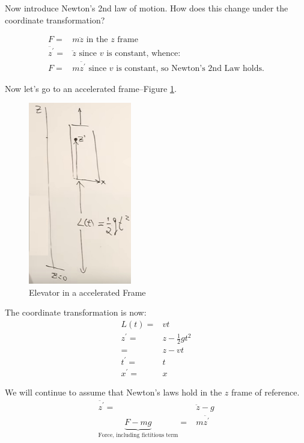 \documentclass[]{article}
\begin{document}
Now introduce Newton's 2nd law of motion. How does this change under the coordinate transformation?

\begin{align*}
	F =& m \ddot{z} \text{ in the $z$ frame}\\
	\ddot{z^\prime} =& \ddot{z} \text{ since $v$ is constant, whence:}\\
	F =& m \ddot{z^\prime} \text{ since $v$ is constant, so Newton's 2nd Law holds.}
\end{align*}

Now let's go to an accelerated frame--Figure \ref{fig:gr-1-elevator-accelerated}.

\begin{figure}[H]
	\begin{center}
		\caption{Elevator in a accelerated Frame}\label{fig:gr-1-elevator-accelerated}
		\includegraphics[width=0.4\textwidth]{gr-1-elevator-accelerated}
	\end{center}
\end{figure}

The coordinate transformation is now:
\begin{align*}
	L(t)=&vt\\
	z^\prime =& z-\frac{1}{2}g t^2\\
	=& z-vt\\
	t^\prime =& t\\
	x^\prime =& x
\end{align*}

We will continue to assume that Newton's laws hold in the $z$ frame of reference.
\begin{align*}
	\ddot{z^\prime} =& \ddot{z}-g\\
	\underbrace{F -mg}_\text{Force, including fictitious term} =& m \ddot{z^\prime} 
\end{align*}
\end{document}

